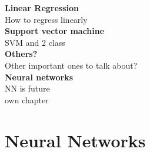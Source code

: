 	  \vspace{5px}
	  \textbf{Linear Regression}\\
	  How to regress linearly\\
	  
	  \vspace{5px}
	  \textbf{Support vector machine}\\
	  SVM and 2 class\\
	  
	  \vspace{5px}
	  \textbf{Others?}\\
	  Other important ones to talk about?\\
	
	
	  \vspace{5px}
	  \textbf{Neural networks}\\
	  NN is future\\
	  own chapter\\
	  

	
\section{Neural Networks}
	  
